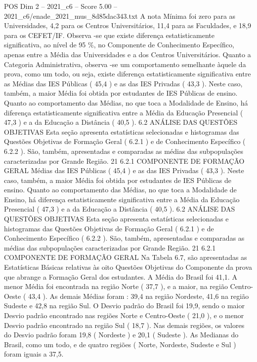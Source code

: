 \begin{textsample}{POS Dim 2 – 2021\_c6 – Score 5.00 – 2021\_c6/enade\_2021\_mus\_8d85dac343.txt}
A nota Mínima foi zero para as Universidades, 4,2 para os Centros Universitários, 11,4 para as Faculdades, e 18,9 para os CEFET/IF.
Observa -se que existe diferença estatisticamente significativa, ao nível de 95 \%, no Componente de Conhecimento Específico, apenas entre a Média das Universidades e a dos Centros Universitários.
Quanto a Categoria Administrativa, observa -se um comportamento semelhante àquele da prova, como um todo, ou seja, existe diferença estatisticamente significativa entre as Médias das IES Públicas ( 45,4 ) e as das IES Privadas ( 43,3 ).
Neste caso, também, a maior Média foi obtida por estudantes de IES Públicas de ensino.
Quanto ao comportamento das Médias, no que toca a Modalidade de Ensino, há diferença estatisticamente significativa entre a Média da Educação Presencial ( 47,3 ) e a da Educação a Distância ( 40,5 ). 6.2 ANÁLISE DAS QUESTÕES OBJETIVAS Esta seção apresenta estatísticas selecionadas e histogramas das Questões Objetivas de Formação Geral ( 6.2.1 ) e de Conhecimento Específico ( 6.2.2 ).
São, também, apresentadas e comparadas as médias das subpopulações caracterizadas por Grande Região. 21 6.2.1 COMPONENTE DE FORMAÇÃO GERAL Médias das IES Públicas ( 45,4 ) e as das IES Privadas ( 43,3 ).
Neste caso, também, a maior Média foi obtida por estudantes de IES Públicas de ensino.
Quanto ao comportamento das Médias, no que toca a Modalidade de Ensino, há diferença estatisticamente significativa entre a Média da Educação Presencial ( 47,3 ) e a da Educação a Distância ( 40,5 ). 6.2 ANÁLISE DAS QUESTÕES OBJETIVAS Esta seção apresenta estatísticas selecionadas e histogramas das Questões Objetivas de Formação Geral ( 6.2.1 ) e de Conhecimento Específico ( 6.2.2 ).
São, também, apresentadas e comparadas as médias das subpopulações caracterizadas por Grande Região. 21 6.2.1 COMPONENTE DE FORMAÇÃO GERAL Na Tabela 6.7, são apresentadas as Estatísticas Básicas relativas às oito Questões Objetivas do Componente da prova que abrange a Formação Geral dos estudantes.
A Média do Brasil foi 41,1.
A menor Média foi encontrada na região Norte ( 37,7 ), e a maior, na região Centro-Oeste ( 43,4 ).
As demais Médias foram : 39,4 na região Nordeste, 41,6 na região Sudeste e 42,8 na região Sul.
O Desvio padrão do Brasil foi 19,9, sendo o maior Desvio padrão encontrado nas regiões Norte e Centro-Oeste ( 21,0 ), e o menor Desvio padrão encontrado na região Sul ( 18,7 ).
Nas demais regiões, os valores do Desvio padrão foram 19,8 ( Nordeste ) e 20,1 ( Sudeste ).
As Medianas do Brasil, como um todo, e de quatro regiões ( Norte, Nordeste, Sudeste e Sul ) foram iguais a 37,5.

\end{textsample}
